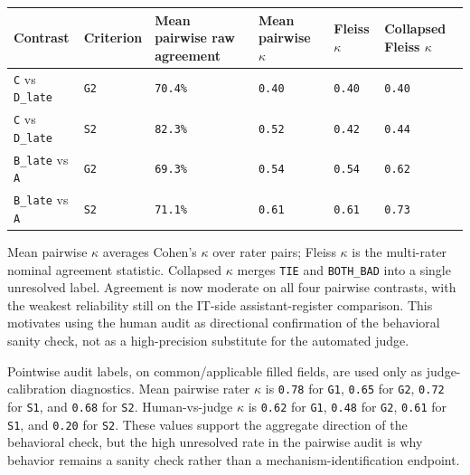 \documentclass[11pt]{article}
\begin{document}
\begin{table}[t]
\centering
\small
\setlength{\tabcolsep}{3pt}
\begin{tabularx}{\linewidth}{@{}>{\raggedright\arraybackslash}X >{\raggedright\arraybackslash}X >{\raggedright\arraybackslash}X >{\raggedright\arraybackslash}X >{\raggedright\arraybackslash}X >{\raggedright\arraybackslash}X@{}}
\toprule
Contrast & Criterion & Mean pairwise raw agreement & Mean pairwise \ensuremath{\kappa} & Fleiss \ensuremath{\kappa} & Collapsed Fleiss \ensuremath{\kappa} \\
\midrule
\texttt{C} vs \texttt{D\_late} & \texttt{G2} & \texttt{70.4\%} & \texttt{0.40} & \texttt{0.40} & \texttt{0.40} \\
\texttt{C} vs \texttt{D\_late} & \texttt{S2} & \texttt{82.3\%} & \texttt{0.52} & \texttt{0.42} & \texttt{0.44} \\
\texttt{B\_late} vs \texttt{A} & \texttt{G2} & \texttt{69.3\%} & \texttt{0.54} & \texttt{0.54} & \texttt{0.62} \\
\texttt{B\_late} vs \texttt{A} & \texttt{S2} & \texttt{71.1\%} & \texttt{0.61} & \texttt{0.61} & \texttt{0.73} \\
\bottomrule
\end{tabularx}
\end{table}

Mean pairwise \ensuremath{\kappa} averages Cohen's \ensuremath{\kappa} over rater pairs; Fleiss \ensuremath{\kappa} is the multi-rater nominal agreement statistic. Collapsed \ensuremath{\kappa} merges \texttt{TIE} and \texttt{BOTH\_BAD} into a single unresolved label. Agreement is now moderate on all four pairwise contrasts, with the weakest reliability still on the IT-side assistant-register comparison. This motivates using the human audit as directional confirmation of the behavioral sanity check, not as a high-precision substitute for the automated judge.

Pointwise audit labels, on common/applicable filled fields, are used only as judge-calibration diagnostics. Mean pairwise rater \ensuremath{\kappa} is \texttt{0.78} for \texttt{G1}, \texttt{0.65} for \texttt{G2}, \texttt{0.72} for \texttt{S1}, and \texttt{0.68} for \texttt{S2}. Human-vs-judge \ensuremath{\kappa} is \texttt{0.62} for \texttt{G1}, \texttt{0.48} for \texttt{G2}, \texttt{0.61} for \texttt{S1}, and \texttt{0.20} for \texttt{S2}. These values support the aggregate direction of the behavioral check, but the high unresolved rate in the pairwise audit is why behavior remains a sanity check rather than a mechanism-identification endpoint.
\end{document}
